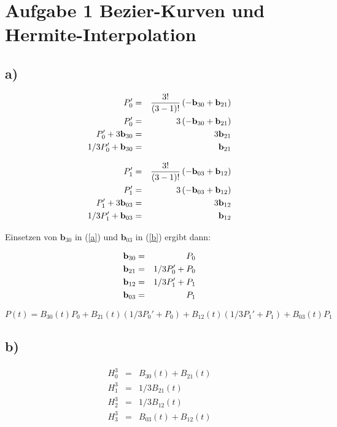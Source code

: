 
\section*{Aufgabe 1 Bezier-Kurven und Hermite-Interpolation}

\subsection*{a)}

\begin{eqnarray}
    P_0' &=& \frac{3!}{(3-1)!} \left( - {\bf b}_{30} + {\bf b}_{21} \right)\\
    P_0' &=& 3 \left( - {\bf b}_{30} + {\bf b}_{21} \right)\\
    P_0'+3{\bf b}_{30} &=& 3 {\bf b}_{21} \\
    1/3 P_0'+{\bf b}_{30} &=& {\bf b}_{21} \label{a}
\end{eqnarray}

\begin{eqnarray}
    P_1' &=& \frac{3!}{(3-1)!} \left( - {\bf b}_{03} + {\bf b}_{12} \right)\\
    P_1' &=& 3 \left( - {\bf b}_{03} + {\bf b}_{12} \right)\\
    P_1'+3{\bf b}_{03} &=& 3 {\bf b}_{12} \\
    1/3 P_1'+{\bf b}_{03} &=& {\bf b}_{12} \label{b}
\end{eqnarray}

Einsetzen von $\mathbf{b}_{30}$ in (\ref{a})  und $\mathbf{b}_{03}$ in (\ref{b}) ergibt dann:

\begin{eqnarray}
    {\bf b}_{30}&=&P_0\\
    {\bf b}_{21}&=&1/3 P_0' + P_0\\
    {\bf b}_{12}&=&1/3 P_1' + P_1\\
    {\bf b}_{03}&=&P_1
\end{eqnarray}

$P(t) = B_{30}(t)P_0 + B_{21}(t)(1/3 P_0' + P_0) + B_{12}(t)(1/3 P_1' + P_1) + B_{03}(t)P_1 $


\subsection*{b)}
\begin{eqnarray}
    H^3_0 &=& B_{30}(t) +B_{21}(t) \\
    H^3_1 &=& 1/3 B_{21}(t)\\
    H^3_2 &=& 1/3 B_{12}(t)\\
    H^3_3 &=& B_{03}(t) +B_{12}(t)
\end{eqnarray}

